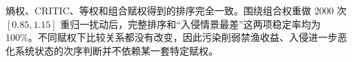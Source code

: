 熵权、CRITIC、等权和组合赋权得到的排序完全一致。围绕组合权重做 2000 次 $[0.85,1.15]$ 重归一扰动后，完整排序和“入侵情景最差”这两项稳定率均为 100\%。不同赋权下比较关系都没有改变，因此污染削弱禁渔收益、入侵进一步恶化系统状态的次序判断并不依赖某一套特定赋权。
